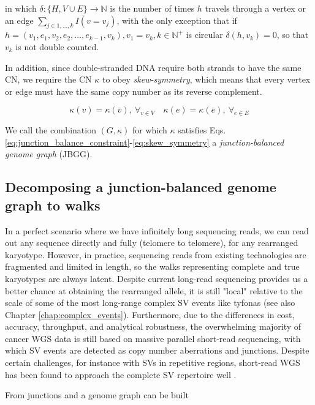 \documentclass[phd,tocprelim]{cornell}
\begin{document}
in which $\delta: \{H, V \cup E\} \rightarrow \mathbb{N}$ is the number of times $h$ travels through a vertex or an edge $\sum_{j \in 1,\dots,k}I(v = v_j)$, with the only exception that if $h = (v_1, e_1, v_2, e_2, \dots, e_{k-1}, v_k), v_1=v_k, k \in \mathbb{N^+}$ is circular $\delta(h,v_k) = 0$, so that $v_k$ is not double counted.

In addition, since double-stranded DNA require both strands to have the same CN, we require the CN $\kappa$ to obey \textit{skew-symmetry}, which means that every vertex or edge must have the same copy number as its reverse complement.

\begin{equation} \label{eq:skew_symmetry}
    \kappa(v) = \kappa(\bar{v}),\ \forall_{v \in V} \quad \kappa(e) = \kappa(\bar{e}),\ \forall_{e \in E} 
\end{equation}

We call the combination $(G,\kappa)$ for which $\kappa$ satisfies Eqs. \ref{eq:junction_balance_constraint}-\ref{eq:skew_symmetry} a \textit{junction-balanced genome graph} (JBGG).

\subsection{Decomposing a junction-balanced genome graph to walks}
In a perfect scenario where we have infinitely long sequencing reads, we can read out any sequence directly and fully (telomere to telomere), for any rearranged karyotype. However, in practice, sequencing reads from existing technologies are fragmented and limited in length, so the walks representing complete and true karyotypes are always latent. Despite current long-read sequencing provides us a better chance at obtaining the rearranged allele, it is still "local" relative to the scale of some of the most long-range complex SV events like tyfonas \cite{Hadi2020-um} (see also Chapter \ref{chap:complex_events}). Furthermore, due to the differences in cost, accuracy, throughput, and analytical robustness, the overwhelming majority of cancer WGS data is still based on massive parallel short-read sequencing, with which SV events are detected as copy number aberrations and junctions. Despite certain challenges, for instance with SVs in repetitive regions, short-read WGS has been found to approach the complete SV repertoire well \cite{Behr2021-gf}.

From junctions and  a genome graph can be built
\end{document}
